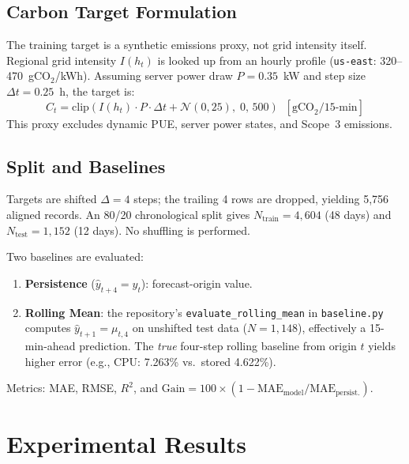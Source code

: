 \documentclass[conference]{IEEEtran}
\begin{document}
\subsection{Carbon Target Formulation}
The training target is a synthetic emissions proxy, not grid intensity itself. Regional grid intensity $I(h_t)$ is looked up from an hourly profile
(\texttt{us-east}: 320--470~gCO$_2$/kWh). Assuming server power draw
$P=0.35$~kW and step size $\Delta t=0.25$~h, the target is:
\begin{equation}
  C_t = \mathrm{clip}\!\left(I(h_t)\cdot P\cdot\Delta t
        + \mathcal{N}(0,25),\;0,\,500\right)
  \;\;[\text{gCO}_2/\text{15-min}]
\end{equation}
This proxy excludes dynamic PUE, server power states, and Scope~3 emissions.

\subsection{Split and Baselines}
Targets are shifted $\Delta=4$ steps; the trailing 4 rows are dropped,
yielding 5,756 aligned records.  An 80/20 chronological split gives
$N_\text{train}=4{,}604$ (48 days) and $N_\text{test}=1{,}152$ (12 days).
No shuffling is performed.

Two baselines are evaluated:
\begin{enumerate}
  \item \textbf{Persistence} ($\hat{y}_{t+4}=y_t$): forecast-origin value.
  \item \textbf{Rolling Mean}: the repository's \texttt{evaluate\_rolling\_mean}
        in \texttt{baseline.py} computes
        $\hat{y}_{t+1}=\mu_{t,4}$ on unshifted test data ($N=1{,}148$),
        effectively a 15-min-ahead prediction.  The \emph{true} four-step
        rolling baseline from origin $t$ yields higher error
        (e.g., CPU: 7.263\% vs.\ stored 4.622\%).
\end{enumerate}

Metrics: MAE, RMSE, $R^2$, and
$\text{Gain}=100\!\times\!(1-\text{MAE}_\text{model}/\text{MAE}_\text{persist.})$.

\section{Experimental Results}
\end{document}
